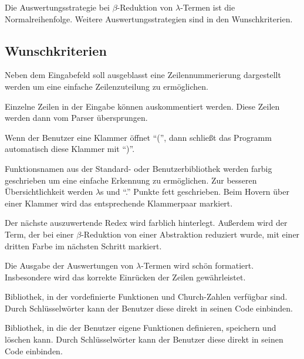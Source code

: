 \documentclass[parskip=full,11pt,twoside]{scrartcl}
\begin{document}
Die Auswertungsstrategie bei $\beta$-Reduktion von $\lambda$-Termen ist die Normalreihenfolge. Weitere Auswertungsstrategien sind in den Wunschkriterien.


\newpage
\subsection{Wunschkriterien}

Neben dem Eingabefeld soll ausgeblasst eine Zeilennummerierung dargestellt werden um eine einfache Zeilenzuteilung zu ermöglichen.

Einzelne Zeilen in der Eingabe können auskommentiert werden. Diese Zeilen werden dann vom Parser übersprungen.

Wenn der Benutzer eine Klammer öffnet \enquote{(}, dann schließt das Programm automatisch diese Klammer mit \enquote{)}.

Funktionsnamen aus der Standard- oder Benutzerbibliothek werden farbig geschrieben um eine einfache Erkennung zu ermöglichen. Zur besseren Übersichtlichkeit werden $\lambda$s und \enquote{.} Punkte fett geschrieben. Beim Hovern über einer Klammer wird das entsprechende Klammerpaar markiert.

Der nächste auszuwertende Redex wird farblich hinterlegt.
Außerdem wird der Term, der bei einer $\beta$-Reduktion von einer Abstraktion reduziert wurde, mit einer dritten Farbe im nächsten Schritt markiert.

Die Ausgabe der Auswertungen von $\lambda$-Termen wird schön formatiert. Insbesondere wird das korrekte Einrücken der Zeilen gewährleistet.

Bibliothek, in der vordefinierte Funktionen und Church-Zahlen verfügbar sind. Durch Schlüsselwörter kann der Benutzer diese direkt in seinen Code einbinden.

Bibliothek, in die der Benutzer eigene Funktionen definieren, speichern und löschen kann. Durch Schlüsselwörter kann der Benutzer diese direkt in seinen Code einbinden.
\end{document}
